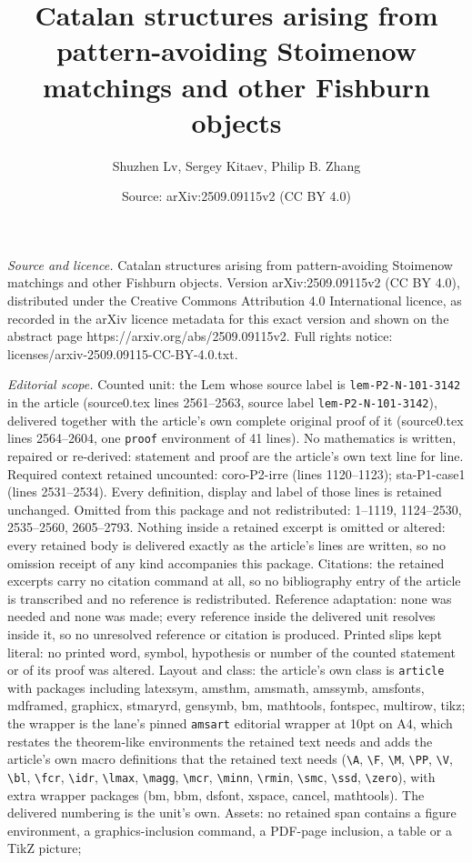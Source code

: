 \documentclass[10pt,a4paper]{amsart}
\title[Catalan structures arising from pattern-avoiding Stoimenow m]{Catalan structures arising from pattern-avoiding Stoimenow matchings and other Fishburn objects}
\author{Shuzhen Lv, Sergey Kitaev, Philip B. Zhang}
\date{Source: arXiv:2509.09115v2 (CC BY 4.0)}
\begin{document}
\maketitle

\noindent\emph{Source and licence.} Catalan structures arising from pattern-avoiding Stoimenow matchings and other Fishburn objects. Version arXiv:2509.09115v2 (CC BY 4.0), distributed under the Creative Commons Attribution 4.0 International licence, as recorded in the arXiv licence metadata for this exact version and shown on the abstract page https://arxiv.org/abs/2509.09115v2. Full rights notice: licenses/arxiv-2509.09115-CC-BY-4.0.txt.\par\smallskip

\noindent\textit{Editorial scope.} Counted unit: the Lem whose source label is \texttt{lem-P2-N-101-3142} in the article (source0.tex lines 2561--2563, source label \texttt{lem-P2-N-101-3142}), delivered together with the article's own complete original proof of it (source0.tex lines 2564--2604, one \texttt{proof} environment of 41 lines). No mathematics is written, repaired or re-derived: statement and proof are the article's own text line for line. Required context retained uncounted: coro-P2-irre (lines 1120--1123); sta-P1-case1 (lines 2531--2534). Every definition, display and label of those lines is retained unchanged. Omitted from this package and not redistributed: 1--1119, 1124--2530, 2535--2560, 2605--2793. Nothing inside a retained excerpt is omitted or altered: every retained body is delivered exactly as the article's lines are written, so no omission receipt of any kind accompanies this package. Citations: the retained excerpts carry no citation command at all, so no bibliography entry of the article is transcribed and no reference is redistributed. Reference adaptation: none was needed and none was made; every reference inside the delivered unit resolves inside it, so no unresolved reference or citation is produced. Printed slips kept literal: no printed word, symbol, hypothesis or number of the counted statement or of its proof was altered. Layout and class: the article's own class is \texttt{article} with packages including latexsym, amsthm, amsmath, amssymb, amsfonts, mdframed, graphicx, stmaryrd, gensymb, bm, mathtools, fontspec, multirow, tikz; the wrapper is the lane's pinned \texttt{amsart} editorial wrapper at 10pt on A4, which restates the theorem-like environments the retained text needs and adds the article's own macro definitions that the retained text needs (\texttt{\textbackslash A}, \texttt{\textbackslash F}, \texttt{\textbackslash M}, \texttt{\textbackslash PP}, \texttt{\textbackslash V}, \texttt{\textbackslash bl}, \texttt{\textbackslash fcr}, \texttt{\textbackslash idr}, \texttt{\textbackslash lmax}, \texttt{\textbackslash magg}, \texttt{\textbackslash mcr}, \texttt{\textbackslash minn}, \texttt{\textbackslash rmin}, \texttt{\textbackslash smc}, \texttt{\textbackslash ssd}, \texttt{\textbackslash zero}), with extra wrapper packages (bm, bbm, dsfont, xspace, cancel, mathtools). The delivered numbering is the unit's own. Assets: no retained span contains a figure environment, a graphics-inclusion command, a PDF-page inclusion, a table or a TikZ picture; 
\end{document}
